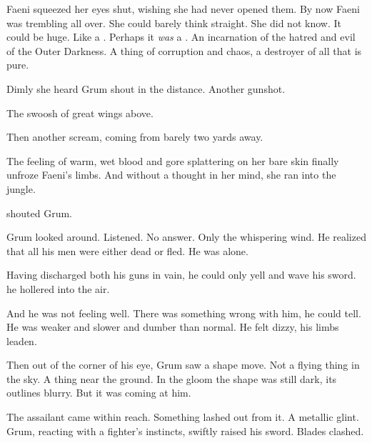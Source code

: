 Faeni squeezed her eyes shut, wishing she had never opened them. 
By now Faeni was trembling all over. 
She could barely think straight. 
She did not know.  
It could be huge. 
Like a \dragon.
Perhaps it \emph{was} a \dragon.
An incarnation of the hatred and evil of the Outer Darkness.
A thing of corruption and chaos, a destroyer of all that is pure.

Dimly she heard Grum shout in the distance. 
Another gunshot. 

The swoosh of great wings above. 

Then another \human scream, coming from barely two yards away. 

The feeling of warm, wet blood and gore splattering on her bare skin finally unfroze Faeni's limbs. 
And without a thought in her mind, she ran into the jungle. 



\begin{comment}
  \subsection{Grum dies}
\end{comment}
\new 
{} shouted Grum.

Grum looked around. 
Listened. 
No answer. 
Only the whispering wind. 
He realized that all his men were either dead or fled. 
He was alone. 

Having discharged both his guns in vain, he could only yell and wave his sword. 
he hollered into the air.

And he was not feeling well. 
There was something wrong with him, he could tell.
He was weaker and slower and dumber than normal.
He felt dizzy, his limbs leaden. 


Then out of the corner of his eye, Grum saw a shape move. 
Not a flying thing in the sky.
A thing near the ground. 
In the gloom the shape was still dark, its outlines blurry. 
But it was coming at him. 

The assailant came within reach. 
Something lashed out from it. 
A metallic glint. 
Grum, reacting with a fighter's instincts, swiftly raised his sword. 
Blades clashed. 

